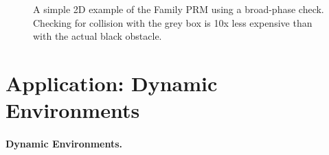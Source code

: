 \begin{figure}
{   }

   \caption{A simple 2D example of the Family PRM using
     a broad-phase check.
     Checking for collision with the grey box is 10x less expensive
     than with the actual black obstacle.}
   \label{fig:family:broad-phase-2d}
\end{figure}

\section{Application: Dynamic Environments}

\paragraph{Dynamic Environments.}
\label{subsec:family:dynamic-environments}

